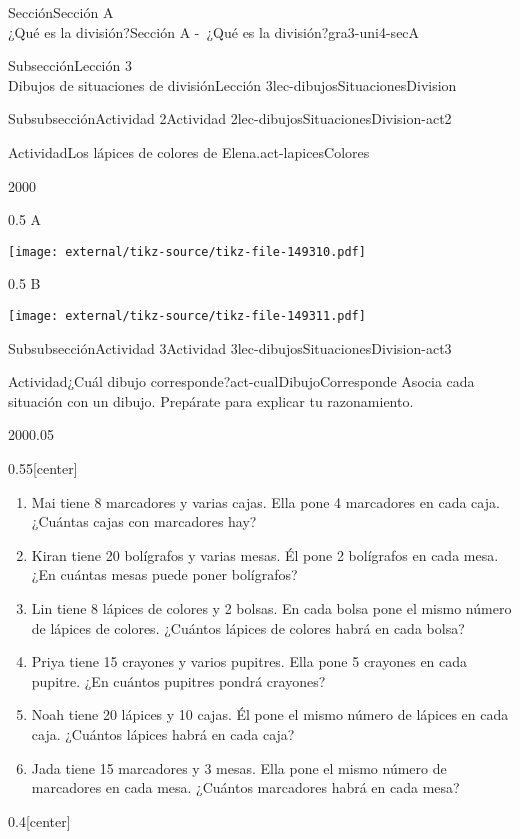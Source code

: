 \begin{sectionptx}{Sección}{{\Large Sección A\\}¿Qué es la división?}{}{Sección A -~¿Qué es la división?}{}{}{gra3-uni4-secA}
\begin{subsectionptx}{Subsección}{{\normalsize Lección 3\\[-0.05cm]}Dibujos de situaciones de división}{}{Lección 3}{}{}{lec-dibujosSituacionesDivision}
\begin{subsubsectionptx}{Subsubsección}{Actividad 2}{}{Actividad 2}{}{}{lec-dibujosSituacionesDivision-act2}
\begin{activity}{Actividad}{Los lápices de colores de Elena.}{act-lapicesColores}
\begin{sidebyside}{2}{0}{0}{0}
\begin{sbspanel}{0.5}%
A%
\par
\texttt{[image: external/tikz-source/tikz-file-149310.pdf]}
\end{sbspanel}%
\begin{sbspanel}{0.5}%
B%
\par
\texttt{[image: external/tikz-source/tikz-file-149311.pdf]}
\end{sbspanel}%
\end{sidebyside}%
\end{activity}%
\end{subsubsectionptx}
%
%
\typeout{************************************************}
\typeout{************************************************}
%
\begin{subsubsectionptx}{Subsubsección}{Actividad 3}{}{Actividad 3}{}{}{lec-dibujosSituacionesDivision-act3}
\begin{activity}{Actividad}{¿Cuál dibujo corresponde?}{act-cualDibujoCorresponde}%
Asocia cada situación con un dibujo. Prepárate para explicar tu razonamiento.%
\begin{sidebyside}{2}{0}{0}{0.05}%
\begin{sbspanel}{0.55}[center]%
%
\begin{enumerate}
\item{}Mai tiene 8 marcadores y varias cajas. Ella pone 4 marcadores en cada caja. ¿Cuántas cajas con marcadores hay?%
\item{}Kiran tiene 20 bolígrafos y varias mesas. Él pone 2 bolígrafos en cada mesa. ¿En cuántas mesas puede poner bolígrafos?%
\item{}Lin tiene 8 lápices de colores y 2 bolsas. En cada bolsa pone el mismo número de lápices de colores. ¿Cuántos lápices de colores habrá en cada bolsa?%
\item{}Priya tiene 15 crayones y varios pupitres. Ella pone 5 crayones en cada pupitre. ¿En cuántos pupitres pondrá crayones?%
\item{}Noah tiene 20 lápices y 10 cajas. Él pone el mismo número de lápices en cada caja. ¿Cuántos lápices habrá en cada caja?%
\item{}Jada tiene 15 marcadores y 3 mesas. Ella pone el mismo número de marcadores en cada mesa. ¿Cuántos marcadores habrá en cada mesa?%
\end{enumerate}
\end{sbspanel}%
\begin{sbspanel}{0.4}[center]%

\end{sbspanel}
\end{sidebyside}
\end{activity}
\end{subsubsectionptx}
\end{subsectionptx}
\end{sectionptx}
